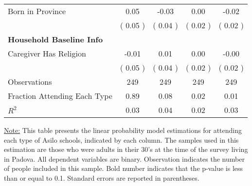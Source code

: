 \begin{table}[H]
{\begin{tabular}{lcccc}
\quad Born in Province &      0.05 &     -0.03 &      0.00 &     -0.02 \\
\quad  & (     0.05 ) & (     0.04 )  & (     0.02 )  & (     0.02 )  \\
\midrule
\textbf{Household Baseline Info} \\
\quad Caregiver Has Religion &     -0.01 &      0.01 &      0.00 &     -0.00 \\
\quad  & (     0.05 ) & (     0.04 )  & (     0.02 )  & (     0.02 )  \\
\midrule
Observations & 249 & 249 & 249 & 249 \\
Fraction Attending Each Type &      0.89 &      0.08 &      0.02 &      0.01 \\
\midrule
$ R^2$ &      0.03 &      0.04 &      0.02 &      0.03 \\
\bottomrule
\end{tabular}}
\end{table}
\begin{scriptsize}
\noindent\underline{Note:} This table presents the linear probability model estimations for attending each type of Asilo schools, indicated by each column. The samples used in this estimation are those who were adults in their 30's at the time of the survey living in Padova. All dependent variables are binary. Observation indicates the number of people included in this sample. Bold number indicates that the p-value is less than or equal to 0.1. Standard errors are reported in parentheses.
\end{scriptsize}
